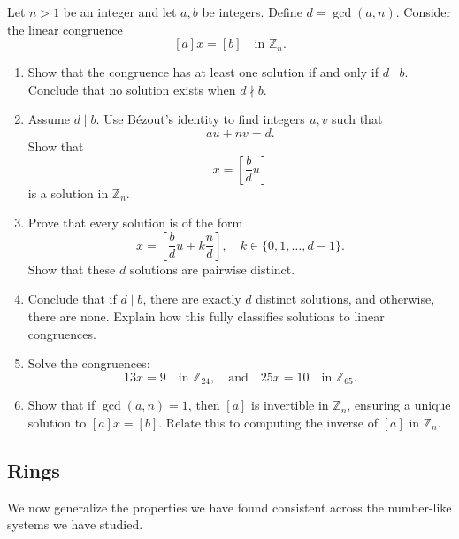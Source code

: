 \documentclass[../main.tex]{subfiles}
\begin{document}
\begin{exercise} \label{ex:linear_congruences}
    Let \( n > 1 \) be an integer and let \( a, b \) be integers. Define \( d = \gcd(a, n) \). Consider the linear congruence
    \[
    [a]x = [b] \quad \text{in } \mathbb{Z}_n.
    \]
    
    \begin{enumerate}
        \item Show that the congruence has at least one solution if and only if \( d \mid b \). Conclude that no solution exists when \( d \nmid b \).
        
        \item Assume \( d \mid b \). Use Bézout’s identity to find integers \( u, v \) such that
        \[
        a u + n v = d.
        \]
        Show that
        \[
        x = \left[\frac{b}{d} u\right]
        \]
        is a solution in \( \mathbb{Z}_n \).
    
        \item Prove that every solution is of the form
        \[
        x = \left[\frac{b}{d} u + k \frac{n}{d}\right], \quad k \in \{0,1,\dots,d-1\}.
        \]
        Show that these \( d \) solutions are pairwise distinct.
    
        \item Conclude that if \( d \mid b \), there are exactly \( d \) distinct solutions, and otherwise, there are none. Explain how this fully classifies solutions to linear congruences.
    
        \item Solve the congruences:
        \[
        13x = 9 \quad \text{in } \mathbb{Z}_{24}, \quad \text{and} \quad 25x = 10 \quad \text{in } \mathbb{Z}_{65}.
        \]
        
        \item Show that if \( \gcd(a, n) = 1 \), then \( [a] \) is invertible in \( \mathbb{Z}_n \), ensuring a unique solution to \( [a]x = [b] \). Relate this to computing the inverse of \( [a] \) in \( \mathbb{Z}_n \).
    \end{enumerate}
    \end{exercise}
    






\subsection{Rings}
\par We now generalize the properties we have found consistent across the number-like systems we have studied. 
\end{document}

